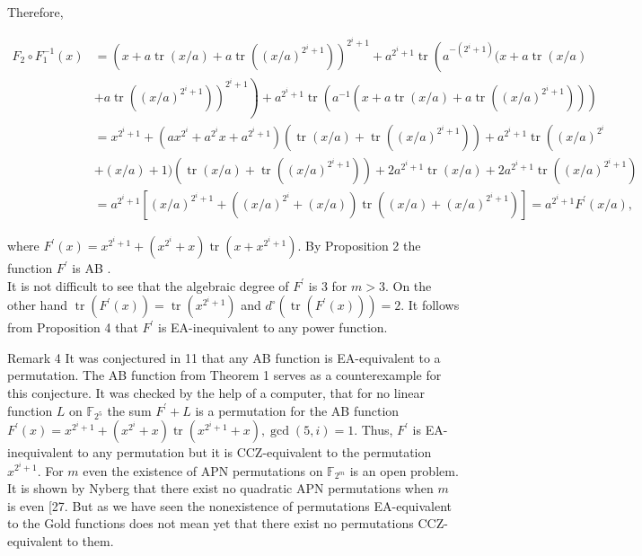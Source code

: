 \documentclass[10pt]{article}
\begin{document}
Therefore,

$$
\begin{aligned}
F_{2} \circ F_{1}^{-1}(x) & =\left(x+a \operatorname{tr}(x / a)+a \operatorname{tr}\left((x / a)^{2^{i}+1}\right)\right)^{2^{i}+1}+a^{2^{i}+1} \operatorname{tr}\left(a^{-\left(2^{i}+1\right)}(x+a \operatorname{tr}(x / a)\right. \\
& \left.\left.+a \operatorname{tr}\left((x / a)^{2^{i}+1}\right)\right)^{2^{i}+1}\right)+a^{2^{i}+1} \operatorname{tr}\left(a^{-1}\left(x+a \operatorname{tr}(x / a)+a \operatorname{tr}\left((x / a)^{2^{i}+1}\right)\right)\right) \\
& =x^{2^{i}+1}+\left(a x^{2^{i}}+a^{2^{i}} x+a^{2^{i}+1}\right)\left(\operatorname{tr}(x / a)+\operatorname{tr}\left((x / a)^{2^{i}+1}\right)\right)+a^{2^{i}+1} \operatorname{tr}\left((x / a)^{2^{i}}\right. \\
& +(x / a)+1)\left(\operatorname{tr}(x / a)+\operatorname{tr}\left((x / a)^{2^{i}+1}\right)\right)+2 a^{2^{i}+1} \operatorname{tr}(x / a)+2 a^{2^{i}+1} \operatorname{tr}\left((x / a)^{2^{i}+1}\right) \\
& =a^{2^{i}+1}\left[(x / a)^{2^{i}+1}+\left((x / a)^{2^{i}}+(x / a)\right) \operatorname{tr}\left((x / a)+(x / a)^{2^{i}+1}\right)\right]=a^{2^{i}+1} F^{\prime}(x / a),
\end{aligned}
$$

where $F^{\prime}(x)=x^{2^{i}+1}+\left(x^{2^{i}}+x\right) \operatorname{tr}\left(x+x^{2^{i}+1}\right)$. By Proposition 2 the function $F^{\prime}$ is AB .\\
It is not difficult to see that the algebraic degree of $F^{\prime}$ is 3 for $m>3$. On the other hand $\operatorname{tr}\left(F^{\prime}(x)\right)=\operatorname{tr}\left(x^{2^{i}+1}\right)$ and $d^{\circ}\left(\operatorname{tr}\left(F^{\prime}(x)\right)\right)=2$. It follows from Proposition 4 that $F^{\prime}$ is EA-inequivalent to any power function.

Remark 4 It was conjectured in 11 that any AB function is EA-equivalent to a permutation. The AB function from Theorem 1 serves as a counterexample for this conjecture. It was checked by the help of a computer, that for no linear function $L$ on $\mathbb{F}_{2^{5}}$ the sum $F^{\prime}+L$ is a permutation for the AB function $F^{\prime}(x)=x^{2^{i}+1}+\left(x^{2^{i}}+x\right) \operatorname{tr}\left(x^{2^{i}+1}+x\right), \operatorname{gcd}(5, i)=1$. Thus, $F^{\prime}$ is EA-inequivalent to any permutation but it is CCZ-equivalent to the permutation $x^{2^{i}+1}$. For $m$ even the existence of APN permutations on $\mathbb{F}_{2^{m}}$ is an open problem. It is shown by Nyberg that there exist no quadratic APN permutations when $m$ is even [27. But as we have seen the nonexistence of permutations EA-equivalent to the Gold functions does not mean yet that there exist no permutations CCZ-equivalent to them.
\end{document}
